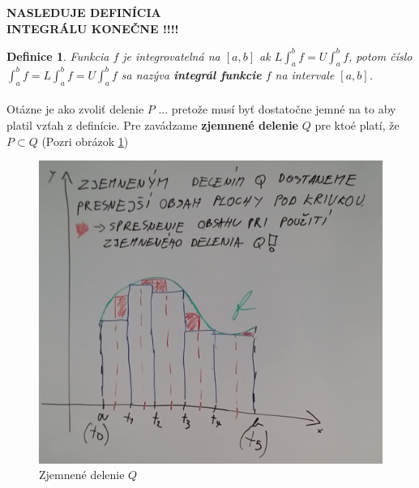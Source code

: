 \documentclass[12pt,a4paper]{article}
\newtheorem{definition}{Definice}
\begin{document}
\vspace{2cm}
\begin{center}
	\begin{Huge}
		\textbf{NASLEDUJE DEFINÍCIA \\ \vspace{1cm} INTEGRÁLU KONEČNE !!!!}
	\end{Huge}
\end{center}
\newpage

\begin{definition}
	Funkcia $f$ je integrovatelná na $[a, b]$ ak $L\int_{a}^{b}f=U\int_{a}^{b}f$, potom číslo $\int_{a}^{b}f=L\int_{a}^{b}f=U\int_{a}^{b}f$ sa nazýva \textbf{integrál funkcie} $f$ na intervale $[a, b]$.
\end{definition}

\paragraph{}
Otázne je ako zvoliť delenie $P$ ... pretože musí byť dostatočne jemné na to aby platil vzťah z definície. Pre zavádzame \textbf{zjemnené delenie} $Q$ pre ktoé platí, že $P\subset Q$ (Pozri obrázok \ref{int4})

\begin{figure}[H]
	\begin{center}
		\includegraphics[scale=0.2]{img/int4}
	\end{center}
	\caption{Zjemnené delenie $Q$\label{int4}}
\end{figure}
\end{document}
